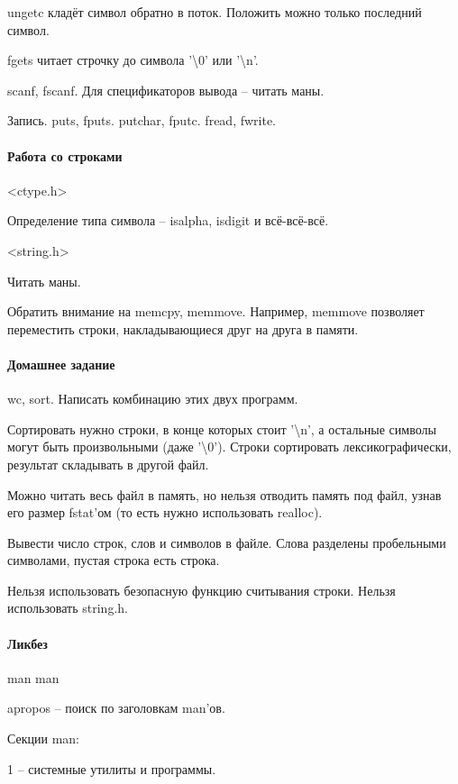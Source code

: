 \documentclass[a4paper,10pt]{article}
\begin{document}
ungetc кладёт символ обратно в поток. Положить можно только последний символ.

fgets читает строчку до символа '\textbackslash{}0' или '\textbackslash{}n'. 

scanf, fscanf. Для спецификаторов вывода -- читать маны.

Запись.
puts, fputs.
putchar, fputc.
fread, fwrite.

\paragraph{Работа со строками}

<ctype.h>

Определение типа символа -- isalpha, isdigit и всё-всё-всё.

<string.h>

Читать маны. 

Обратить внимание на memcpy, memmove. Например, memmove позволяет переместить строки, накладывающиеся друг на друга в памяти.

\paragraph{Домашнее задание}

wc, sort. Написать комбинацию этих двух программ.

Сортировать нужно строки, в конце которых стоит '\textbackslash{}n', а остальные символы могут быть произвольными (даже '\textbackslash{}0'). Строки сортировать лексикографически, результат складывать в другой файл.

Можно читать весь файл в память, но нельзя отводить память под файл, узнав его размер fstat'ом (то есть нужно использовать realloc).

Вывести число строк, слов и символов в файле. Слова разделены пробельными символами, пустая строка есть строка.

Нельзя использовать безопасную функцию считывания строки. Нельзя использовать string.h.

\paragraph{Ликбез}

man man

apropos -- поиск по заголовкам man'ов.

Секции man:

1 -- системные утилиты и программы.
\end{document}
